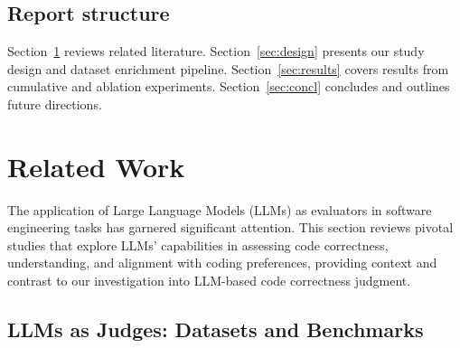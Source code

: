 \documentclass[a4paper]{usiinfbachelorproject}
\begin{document}
\subsection*{Report structure}

Section~\ref{sec:related} reviews related literature.  
Section~\ref{sec:design} presents our study design and dataset enrichment pipeline.  
Section~\ref{sec:results} covers results from cumulative and ablation experiments.  
Section~\ref{sec:concl} concludes and outlines future directions.

\section{Related Work}\label{sec:related}

The application of Large Language Models (LLMs) as evaluators in software engineering tasks has garnered significant attention. This section reviews pivotal studies that explore LLMs' capabilities in assessing code correctness, understanding, and alignment with coding preferences, providing context and contrast to our investigation into LLM-based code correctness judgment.

\subsection{LLMs as Judges: Datasets and Benchmarks}
\end{document}
